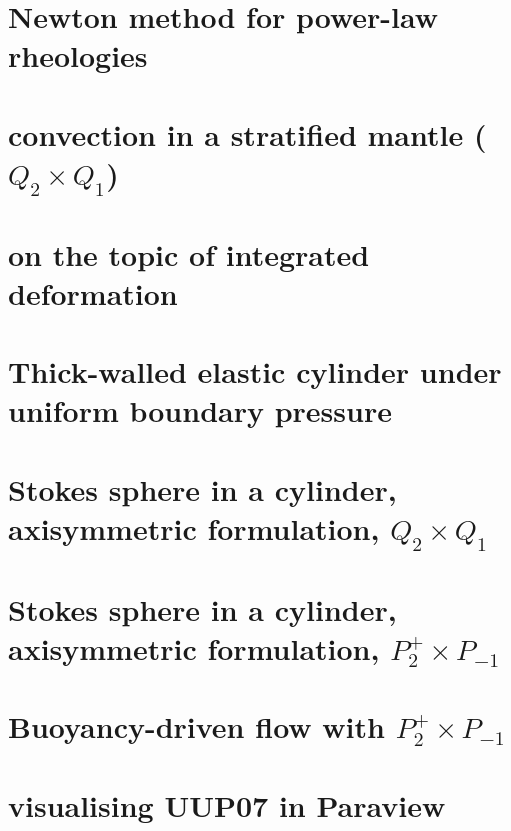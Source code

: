 \documentclass[a4paper,11pt]{report}
\begin{document}
\chapter{Newton method for power-law rheologies \label{f87}}

\chapter{convection in a stratified mantle ($Q_2\times Q_1$) \label{f88}}

\chapter{on the topic of integrated deformation	\label{f89}}

\chapter{Thick-walled elastic cylinder under uniform boundary pressure \label{f90}}

\chapter{Stokes sphere in a cylinder, axisymmetric formulation, $Q_2\times Q_1$ \label{f91}}

\chapter{Stokes sphere in a cylinder, axisymmetric formulation, $P_2^+\times P_{-1}$ \label{f92}}

\chapter{Buoyancy-driven flow with $P_2^+\times P_{-1}$ \label{f93}}

\chapter{visualising UUP07 in Paraview \label{f94}}
\end{document}
